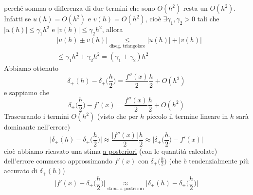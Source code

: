 \documentclass[12pt,a4paper]{article}
\begin{document}
perché somma o differenza di due termini che sono
$O(h^2)$ resta un $O(h^2)$.\\
Infatti se $u(h)=O(h^2)$ e $v(h)=O(h^2)$, cioè $\exists \gamma_1, \gamma_2 > 0$ tali che $|u(h)|\leq \gamma_1 h^2$ e $|v(h)|\leq \gamma_2 h^2$, allora
\begin{equation*}
    \begin{split}
        & |u(h) \pm v(h)| \underset{\text{diseg. triangolare}}{\leq} |u(h)|+|v(h)| \\
        & \leq \gamma_1 h^2 + \gamma_2 h^2 = (\gamma_1 + \gamma_2) h^2
    \end{split}    
\end{equation*}
Abbiamo ottenuto
\begin{equation*}
    \delta_+(h) - \delta_+\biggl(\frac{h}{2}\biggr) = \frac{f''(x)}{2}\frac{h}{2} + O(h^2)
\end{equation*}
e sappiamo che 
\begin{equation*}
    \delta_+\biggl(\frac{h}{2}\biggr) - f'(x) = \frac{f''(x)}{2}\frac{h}{2} + O(h^2)
\end{equation*}
Trascurando i termini $O(h^2)$ (visto che per $h$ piccolo il termine lineare in $h$ sarà dominante nell'errore)
\begin{equation*}
    \biggl|\delta_+(h) - \delta_+\biggl(\frac{h}{2}\biggr)\biggr| \approx \frac{|f''(x)|}{2}\frac{h}{2} \approx \biggl|\delta_+\biggl(\frac{h}{2}\biggr) - f'(x) \biggr|
\end{equation*}
cioè abbiamo ricavato una stima \uline{a posteriori} (con le quantità calcolate) dell'errore commesso approssimando $f'(x)$ con $\delta_+\bigl(\frac{h}{2}\bigr)$ (che è tendenzialmente più accurato di $\delta_+(h)$)
\begin{equation*}
     \biggl|f'(x) - \delta_+\biggl(\frac{h}{2}\biggr) \biggr| \underset{\text{stima a posteriori}}{\approx} \biggl|\delta_+(h) - \delta_+\biggl(\frac{h}{2}\biggr)\biggr|
\end{equation*}
\end{document}
